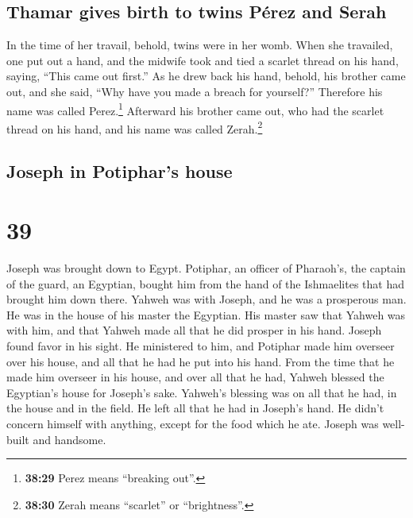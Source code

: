 \hypertarget{thamar-gives-birth-to-twins-puxe9rez-and-serah}{%
\subsection{Thamar gives birth to twins Pérez and
Serah}\label{thamar-gives-birth-to-twins-puxe9rez-and-serah}}

 In the time of her travail, behold, twins were in her
womb.  When she travailed, one put out a hand, and the
midwife took and tied a scarlet thread on his hand, saying, ``This came
out first.''  As he drew back his hand, behold, his
brother came out, and she said, ``Why have you made a breach for
yourself?'' Therefore his name was called Perez.\footnote{\textbf{38:29}
  Perez means ``breaking out''.}  Afterward his brother
came out, who had the scarlet thread on his hand, and his name was
called Zerah.\footnote{\textbf{38:30} Zerah means ``scarlet'' or
  ``brightness''.}

\hypertarget{joseph-in-potiphars-house}{%
\subsection{Joseph in Potiphar's
house}\label{joseph-in-potiphars-house}}

\hypertarget{section-38}{%
\section{39}\label{section-38}}

 Joseph was brought down to Egypt. Potiphar, an officer of
Pharaoh's, the captain of the guard, an Egyptian, bought him from the
hand of the Ishmaelites that had brought him down there. 
Yahweh was with Joseph, and he was a prosperous man. He was in the house
of his master the Egyptian.  His master saw that Yahweh
was with him, and that Yahweh made all that he did prosper in his hand.
 Joseph found favor in his sight. He ministered to him,
and Potiphar made him overseer over his house, and all that he had he
put into his hand.  From the time that he made him
overseer in his house, and over all that he had, Yahweh blessed the
Egyptian's house for Joseph's sake. Yahweh's blessing was on all that he
had, in the house and in the field.  He left all that he
had in Joseph's hand. He didn't concern himself with anything, except
for the food which he ate. Joseph was well-built and handsome.

